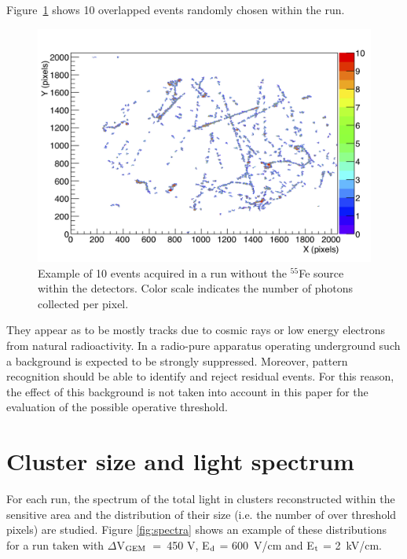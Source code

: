 \documentclass[a4paper]{jpconf}
\begin{document}
Figure~\ref{fig:bkg_evt} shows 10 overlapped events randomly chosen within the run.
%
\begin{figure}[htbp]
\centering
\includegraphics[width=.55\textwidth]{hDisplay_run121.png}
\caption{Example of 10 events acquired in a run without the $^{55}$Fe source within the detectors. Color scale indicates the number of photons collected per pixel.}
\label{fig:bkg_evt}
\end{figure}
%
They appear as to be mostly tracks due to cosmic rays or low energy
electrons from natural radioactivity.  In a radio-pure apparatus
operating underground such a background is expected to be strongly
suppressed.  Moreover, pattern recognition should be able to identify
and reject residual events. For this reason, the effect of this
background is not taken into account in this paper for the evaluation
of the possible operative threshold.


\section{Cluster size and light spectrum}

For each run, the spectrum of the total light in clusters
reconstructed within the sensitive area and the distribution of their
size (i.e. the number of over threshold pixels) are studied.  Figure
\ref{fig:spectra} shows an example of these distributions for a run
taken with $\Delta$V$_{\rm GEM}$~=~450 V, E$_{\rm d}$ = 600~V/cm and
E$_{\rm t}$ = 2~kV/cm.
\end{document}
